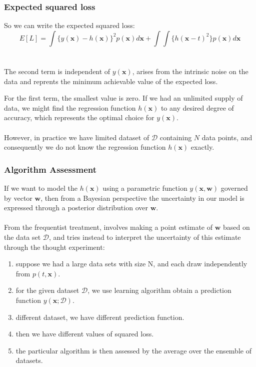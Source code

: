 \documentclass{beamer}
\begin{document}
\begin{frame}
\frametitle{Expected squared loss}
So we can write the expected squared loss:
\begin{equation}
E[L]=\int \{y(\bm{x})-h(\bm{x})\}^2p(\bm{x})d\bm{x}+\int \int \{h(\bm{x}-t)^2\}p(\bm{x})d\bm{x}
\end{equation}\\~\\

The second term is independent of $y(\bm{x})$, arises from the intrinsic noise on the data and reprents the minimum achievable value of the expected loss.

For the first term, the smallest value is zero. If we had an unlimited supply of data, we might find the regression function $h(\bm{x})$ to any desired degree of accuracy, which represents the optimal choice for $y(\bm{x})$.\\~\\

However, in practice we have limited dataset of $\mathcal{D}$ containing $N$ data points, and consequently we do not know the regression function $h(\bm{x})$ exactly.
\end{frame}


\begin{frame}
\frametitle{Algorithm Assessment}
If we want to model the $h(\bm{x})$ using a parametric function $y(\bm{x},\bm{w})$ governed by vector $\bm{w}$, then from a Bayesian perspective the uncertainty in our model is expressed through a posterior distribution over $\bm{w}$.\\~\\

From the frequentist treatment, involves making a point estimate of $\bm{w}$ based on the data set $\mathcal{D}$, and tries instead to interpret the uncertainty of this estimate through the thought experiment:
\begin{enumerate}
\item suppose we had a large data sets with size N, and each draw independently from $p(t,\bm{x})$.
\item for the given dataset $\mathcal{D}$, we use learning algorithm obtain a prediction function $y(\bm{x};\mathcal{D})$.
\item different dataset, we have different prediction function.
\item then we have different values of squared loss.
\item the particular algorithm is then assessed by the average over the ensemble of datasets.
\end{enumerate}
\end{frame}
\end{document}
